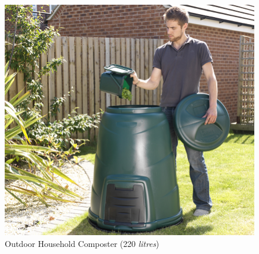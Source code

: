 \documentclass[a4paper,11pt,fleqn]{report}
\begin{document}
\begin{figure}[h!]
\begin{center}
\includegraphics[scale = 1.1]{Outdoor_Composter.jpg}
\caption{Outdoor Household Composter (220 \textit{litres})}
\label{fig: Outdoor Composter}
\end{center}
\end{figure}
\end{document}
